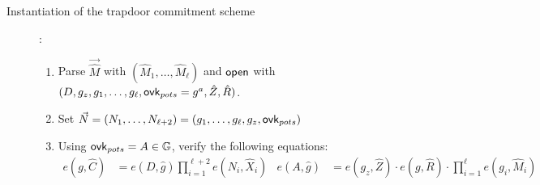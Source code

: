 \begin{section}{Instantiation of the trapdoor commitment scheme}
\begin{description}
	\item[] :
		\begin{enumerate}
		\item Parse $\vec{\hat{M}}$ with $(\hat{M}_1, \dots, \hat{M}_\ell)$ and $\mathsf{open}$ with $(D, g_z, g_1, \dots, g_\ell, \mathsf{ovk}_{pots} = g^a, \hat{Z}, \hat{R})$.
		\item Set $\vec{N} = (N_1, \dots, N_{\ell+2}) = (g_1, \dots, g_\ell, g_z, \mathsf{ovk}_{pots})$
		\item Using $\mathsf{ovk}_{pots} = A \in \mathbb{G}$, verify the following equations:
		\begin{align*}
			e(g, \hat{C}) &= e(D, \hat{g}) \prod_{i = 1}^{\ell+2} e(N_i, \hat{X}_i) & e(A, \hat{g}) &= e(g_z, \hat{Z}) \cdot e(g, \hat{R}) \cdot \prod_{i = 1}^\ell e(g_i, \hat{M}_i) 
		\end{align*}
		\end{enumerate}
  \end{description}
\end{section}


